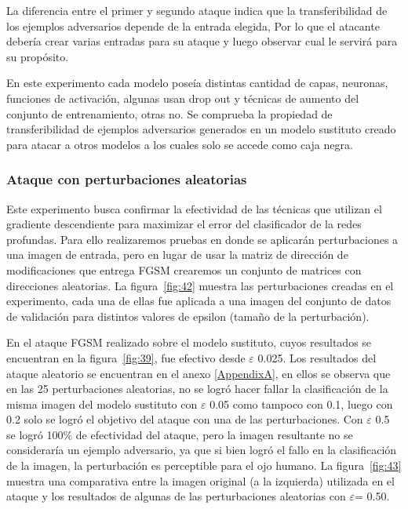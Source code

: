 La diferencia entre el primer y segundo ataque indica que la transferibilidad de los ejemplos adversarios depende de la entrada elegida, Por lo que el atacante debería crear varias entradas para su ataque y luego observar cual le servirá para su propósito.

En este experimento cada modelo poseía distintas cantidad de capas, neuronas, funciones de activación, algunas usan drop out y técnicas de aumento del conjunto de entrenamiento, otras no. Se comprueba la propiedad de transferibilidad de ejemplos adversarios generados en un modelo sustituto creado  para atacar a otros modelos a los cuales solo se accede como caja negra.



\subsubsection{Ataque con perturbaciones aleatorias}

Este experimento busca confirmar la efectividad de las técnicas que utilizan el gradiente descendiente para maximizar el error del clasificador de la redes profundas. Para ello realizaremos pruebas en donde se aplicarán perturbaciones a una imagen de entrada, pero en lugar de usar la matriz de dirección de modificaciones que entrega FGSM crearemos un conjunto de matrices con direcciones aleatorias. La figura~\ref{fig:42} muestra las perturbaciones creadas en el experimento, cada una de ellas fue aplicada a una imagen del conjunto de datos de validación para distintos valores de epsilon (tamaño de la perturbación).

En el ataque FGSM realizado sobre el modelo sustituto, cuyos resultados se encuentran en la figura~\ref{fig:39}, fue efectivo desde $\varepsilon$ 0.025. Los resultados del ataque aleatorio se encuentran en el anexo \ref{AppendixA}, en ellos se observa que en las 25 perturbaciones aleatorias, no se logró hacer fallar la clasificación de la misma imagen del modelo sustituto con $\varepsilon$ 0.05 como tampoco con 0.1, luego con 0.2 solo se logró el objetivo del ataque con una de las perturbaciones. Con $\varepsilon$ 0.5 se logró 100\% de efectividad del ataque, pero la imagen resultante no se consideraría un ejemplo adversario, ya que si bien logró el fallo en la clasificación de la imagen, la perturbación es perceptible para el ojo humano. La figura~\ref{fig:43} muestra una comparativa entre la imagen original (a la izquierda) utilizada en el ataque y los resultados de algunas de las perturbaciones aleatorias con  $\varepsilon$= 0.50.


